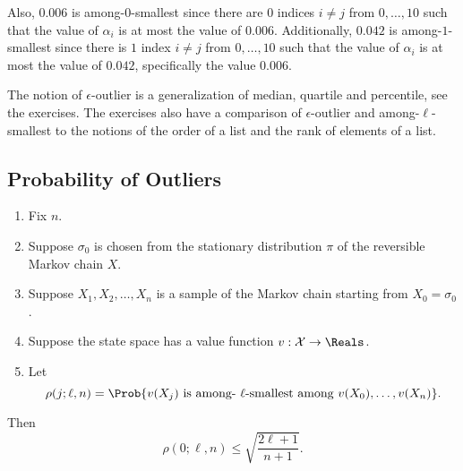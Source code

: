 \documentclass[12pt]{article}
\begin{document}
\begin{example}
    Also, \( 0.006 \) is among-\( 0 \)-smallest since there are \( 0 \)
    indices \( i \ne j \) from \( 0, \dots, 10 \) such that the value of
    \( \alpha_i \) is at most the value of \( 0.006 \).  Additionally, \(
    0.042 \) is among-\( 1 \)-smallest since there is \( 1 \) index \( i
    \ne j \) from \( 0, \dots, 10 \) such that the value of \( \alpha_i \)
    is at most the value of \( 0.042 \), specifically the value \( 0.006
    \).

    The notion of \( \epsilon \)-outlier is a generalization of median,
    quartile and percentile, see the exercises. The exercises also have
    a comparison of \( \epsilon \)-outlier and among-\( \ell \)-smallest
    to the notions of the order of a list and the rank of elements of a
    list.
\end{example}

\subsection*{Probability of Outliers}

\begin{proposition}
    \label{thm:serialsignificance:basethm}
    \begin{enumerate}
        \item
            Fix \( n \).
        \item
            Suppose \( \sigma_0 \) is chosen from the stationary
            distribution \( \pi \) of the reversible Markov chain \( X \).
        \item
            Suppose \( X_1, X_2, \dots, X_n \) is a sample of the Markov
            chain starting from \( X_0 = \sigma_0 \).
        \item
            Suppose the state space has a value function \( v :
            \mathcal {X} \to \Reals \).
        \item
            Let
            \[
                \rho(j; \ell, n) = \Prob{v(X_j) \text{ is among- \(
                    \ell \)-smallest among } v(X_0), \dots, v(X_n) }.
            \]
    \end{enumerate}

    Then
    \[
        \rho(0; \ell, n) \le \sqrt{ \frac{2\ell + 1}{n+1}}.
    \]
\end{proposition}
\end{document}
